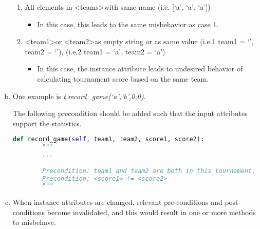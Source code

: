 \documentclass[12pt]{article}
\begin{document}
\begin{enumerate}[a.]
\begin{mdframed}
\begin{enumerate}[1.]
            \item All elements in \textless teams\textgreater with same
            name (i.e. [`a', `a', `a'])
            \begin{itemize}
                \item In this case, this leads to the same misbehavior as case 1.
            \end{itemize}
            \item \textless team1\textgreater or \textless team2\textgreater as
            empty string or as same value (i.e.1 team1 = `', team2 = `'), (i.e.2
            team1 = `a', team2 = `a')
            \begin{itemize}
                \item In this case, the instance attribute leads to undesired behavior
                of calculating tournament score based on the same team.
            \end{itemize}
        \end{enumerate}
    \end{mdframed}

    \item

    One example is \textit{t.record\_game(`a',`b',0,0)}.

    \bigskip

    The following precondition should be added such that the input attributes
    support the statistics.

    \begin{lstlisting}[language=Python]
    def record_game(self, team1, team2, score1, score2):
        """
        ...

        Precondition: team1 and team2 are both in this tournament.
        Precondition: <score1> != <score2>
        """

    \end{lstlisting}

    \item

    When instance attributes are changed, relevant pre-conditions and post-conditions
    become invalidated, and this would result in one or more methods to misbehave.

\end{enumerate}
\end{document}
